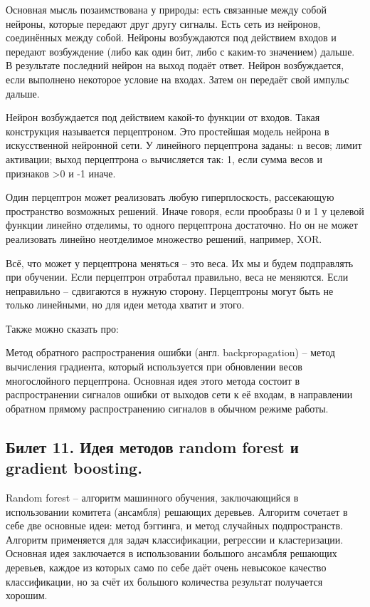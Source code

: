 \documentclass[a4paper, 12pt]{article}
\begin{document}
	Основная мысль позаимствована у природы: есть связанные между собой нейроны, которые передают друг другу сигналы.
	Есть сеть из нейронов, соединённых между собой.
	Нейроны возбуждаются под действием входов и передают возбуждение (либо как один бит, либо с каким-то значением) дальше.
	В результате последний нейрон на выход подаёт ответ. 
	Нейрон возбуждается, если выполнено некоторое условие на входах.
	Затем он передаёт свой импульс дальше.

	Нейрон возбуждается под действием какой-то функции от входов. Такая конструкция называется перцептроном. Это простейшая модель нейрона в искусственной нейронной сети.
	У линейного перцептрона заданы:
	n весов;
	лимит активации;
	выход перцептрона o вычисляется так:
	1, если сумма весов и признаков >0 и -1 иначе.

	Один перцептрон может реализовать любую гиперплоскость, рассекающую пространство возможных решений. Иначе говоря, если прообразы 0 и 1 у целевой функции линейно отделимы, то одного перцептрона достаточно.
	Но он не может реализовать линейно неотделимое множество решений, например, XOR.

	Всё, что может у перцептрона меняться -- это веса.
	Их мы и будем подправлять при обучении.
	Eсли перцептрон отработал правильно, веса не меняются. Если неправильно -- сдвигаются в нужную сторону. Перцептроны могут быть не только линейными, но для идеи метода хватит и этого.

	Также можно сказать про:

	Метод обратного распространения ошибки (англ. backpropagation) -- метод вычисления градиента, который используется при обновлении весов многослойного перцептрона. Основная идея этого метода состоит в распространении сигналов ошибки от выходов сети к её входам, в направлении обратном прямому распространению сигналов в обычном режиме работы.
	
	\subsection*{Билет 11.  Идея методов random forest и gradient boosting.}
	Random forest -- алгоритм машинного обучения, заключающийся в использовании комитета (ансамбля) решающих деревьев. Алгоритм сочетает в себе две основные идеи: метод бэггинга, и метод случайных подпространств. Алгоритм применяется для задач классификации, регрессии и кластеризации. Основная идея заключается в использовании большого ансамбля решающих деревьев, каждое из которых само по себе даёт очень невысокое качество классификации, но за счёт их большого количества результат получается хорошим.
	
\end{document}
